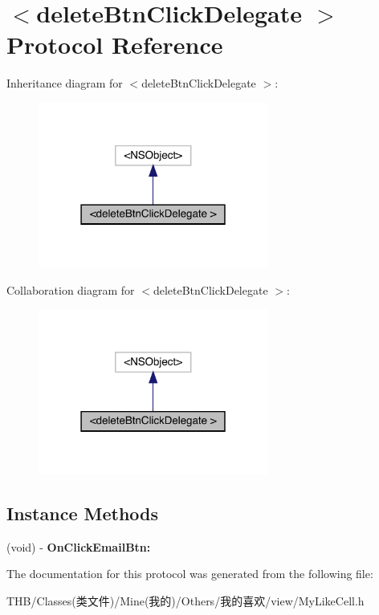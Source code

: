 \hypertarget{protocoldelete_btn_click_delegate_01-p}{}\section{$<$delete\+Btn\+Click\+Delegate $>$ Protocol Reference}
\label{protocoldelete_btn_click_delegate_01-p}


Inheritance diagram for $<$delete\+Btn\+Click\+Delegate $>$\+:\nopagebreak
\begin{figure}[H]
\begin{center}
\leavevmode
\includegraphics[width=214pt]{protocoldelete_btn_click_delegate_01-p__inherit__graph}
\end{center}
\end{figure}


Collaboration diagram for $<$delete\+Btn\+Click\+Delegate $>$\+:\nopagebreak
\begin{figure}[H]
\begin{center}
\leavevmode
\includegraphics[width=214pt]{protocoldelete_btn_click_delegate_01-p__coll__graph}
\end{center}
\end{figure}
\subsection*{Instance Methods}
\begin{DoxyCompactItemize}
\item 
\mbox{\label{protocoldelete_btn_click_delegate_01-p_a39b852b05f538199907f6bea3dd384d7}} 
(void) -\/ {\bfseries On\+Click\+Email\+Btn\+:}
\end{DoxyCompactItemize}


The documentation for this protocol was generated from the following file\+:\begin{DoxyCompactItemize}
\item 
T\+H\+B/\+Classes(类文件)/\+Mine(我的)/\+Others/我的喜欢/view/My\+Like\+Cell.\+h\end{DoxyCompactItemize}
